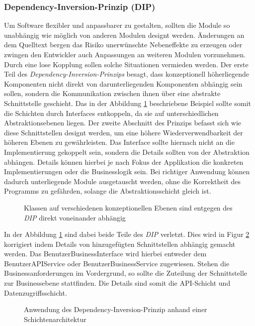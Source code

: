 \documentclass[conference]{IEEEtran}
\begin{document}
\subsubsection{Dependency-Inversion-Prinzip (DIP)} Um Software flexibler und anpassbarer zu gestalten, sollten die Module so unabhängig wie möglich von anderen Modulen designt werden. Änderungen an dem Quelltext bergen das Risiko unerwünschte Nebeneffekte zu erzeugen oder zwingen den Entwickler auch Anpassungen an weiteren Modulen vorzunehmen. Durch eine lose Kopplung sollen solche Situationen vermieden werden. Der erste Teil des \emph{Dependency-Inversion-Prinzips} besagt, dass konzeptionell höherliegende Komponenten nicht direkt von darunterliegenden Komponenten abhängig sein sollen, sondern die Kommunikation zwischen ihnen über eine abstrakte Schnittstelle geschieht. Das in der Abbildung \ref{fig:VorDIP} beschriebene Beispiel sollte somit die Schichten durch Interfaces entkoppeln, da sie auf unterschiedlichen Abstraktionsebenen liegen. Der zweite Abschnitt des Prinzips befasst sich wie diese Schnittstellen designt werden, um eine höhere Wiederverwendbarkeit der höheren Ebenen zu gewährleisten. Das Interface sollte hiernach nicht an die Implementierung gekoppelt sein, sondern die Details sollten von der Abstraktion abhängen. Details können hierbei je nach Fokus der Applikation die konkreten Implementierungen oder die Businesslogik sein. Bei richtiger Anwendung können dadurch unterliegende Module ausgetauscht werden, ohne die Korrektheit des Programms zu gefährden, solange die Abstraktionsschicht gleich ist. \cite{Martin.1996} \cite{Martin.2003} \cite{Martin.2018}

\begin{figure}[htbp]
	\small
	
	\caption{Klassen auf verschiedenen konzeptionellen Ebenen sind entgegen des \emph{DIP} direkt voneinander abhängig}
	\label{fig:VorDIP}
\end{figure}

In der Abbildung \ref{fig:VorDIP} sind dabei beide Teile des \emph{DIP} verletzt. Dies wird in Figur \ref{fig:NachDIP} korrigiert indem Details von hinzugefügten Schnittstellen abhängig gemacht werden. Das BenutzerBusinessInterface wird hierbei entweder dem BenutzerAPIService oder BenutzerBusinessService zugewiesen. Stehen die Businessanforderungen im Vordergrund, so sollte die Zuteilung der Schnittstelle zur Businessebene stattfinden. Die Details sind somit die API-Schicht und Datenzugriffsschicht. 

\begin{figure}[htbp]
	\small
	
	\caption{Anwendung des Dependency-Inversion-Prinzip anhand einer Schichtenarchitektur}
	\label{fig:NachDIP}
\end{figure}
\end{document}

